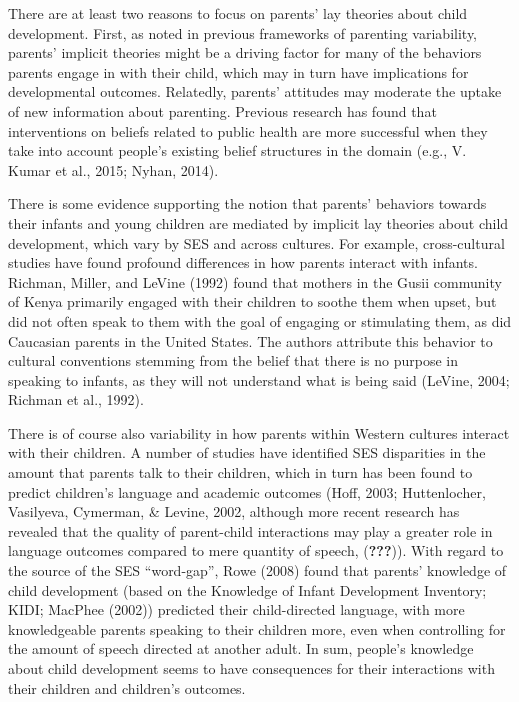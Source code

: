 \documentclass[floatsintext,man]{apa6}
\theoremstyle{definition}
\theoremstyle{definition}
\theoremstyle{definition}
\theoremstyle{remark}
\begin{document}
There are at least two reasons to focus on parents' lay theories about
child development. First, as noted in previous frameworks of parenting
variability, parents' implicit theories might be a driving factor for
many of the behaviors parents engage in with their child, which may in
turn have implications for developmental outcomes. Relatedly, parents'
attitudes may moderate the uptake of new information about parenting.
Previous research has found that interventions on beliefs related to
public health are more successful when they take into account people's
existing belief structures in the domain (e.g., V. Kumar et al., 2015;
Nyhan, 2014).

There is some evidence supporting the notion that parents' behaviors
towards their infants and young children are mediated by implicit lay
theories about child development, which vary by SES and across cultures.
For example, cross-cultural studies have found profound differences in
how parents interact with infants. Richman, Miller, and LeVine (1992)
found that mothers in the Gusii community of Kenya primarily engaged
with their children to soothe them when upset, but did not often speak
to them with the goal of engaging or stimulating them, as did Caucasian
parents in the United States. The authors attribute this behavior to
cultural conventions stemming from the belief that there is no purpose
in speaking to infants, as they will not understand what is being said
(LeVine, 2004; Richman et al., 1992).

There is of course also variability in how parents within Western
cultures interact with their children. A number of studies have
identified SES disparities in the amount that parents talk to their
children, which in turn has been found to predict children's language
and academic outcomes (Hoff, 2003; Huttenlocher, Vasilyeva, Cymerman, \&
Levine, 2002, although more recent research has revealed that the
quality of parent-child interactions may play a greater role in language
outcomes compared to mere quantity of speech, ({\textbf{???}})). With
regard to the source of the SES \enquote{word-gap}, Rowe (2008) found
that parents' knowledge of child development (based on the Knowledge of
Infant Development Inventory; KIDI; MacPhee (2002)) predicted their
child-directed language, with more knowledgeable parents speaking to
their children more, even when controlling for the amount of speech
directed at another adult. In sum, people's knowledge about child
development seems to have consequences for their interactions with their
children and children's outcomes.
\end{document}

